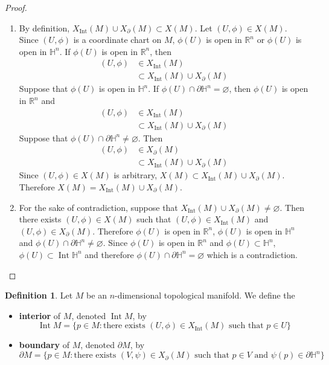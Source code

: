 \documentclass{book}
\theoremstyle{definition}
\newtheorem{defn}[definition]{Definition}
\renewcommand{\H}{\mathbb{H}}
\newcommand{\R}{\mathbb{R}}
\DeclareMathOperator{\Int}{Int}
\DeclareMathOperator*{\0}{\mbf{0}}
\DeclareMathOperator*{\1}{\mbf{1}}
\newcommand{\tbf}[1]{\textbf{#1}}
\newcommand{\p}{\partial}
\begin{document}
	\begin{proof}\
		\begin{enumerate}
			\item By definition, $X_{\Int}(M) \cup X_{\p}(M) \subset X(M)$. Let $(U, \phi) \in X(M)$. Since $(U, \phi)$ is a coordinate chart on $M$, $\phi(U)$ is open in $\R^n$ or $\phi(U)$ is open in $\H^n$. If $\phi(U)$ is open in $\R^n$, then 
			\begin{align*}
				(U, \phi) 
				& \in X_{\Int}(M) \\
				& \subset X_{\Int}(M) \cup X_{\p}(M)
			\end{align*}
			Suppose that $\phi(U)$ is open in $\H^n$. If $\phi(U) \cap \p \H^n = \varnothing$, then $\phi(U)$ is open in $\R^n$ and 
			\begin{align*}
				(U, \phi) 
				& \in X_{\Int}(M) \\
				& \subset X_{\Int}(M) \cup X_{\p}(M)
			\end{align*}
			Suppose that $\phi(U) \cap \p \H^n \neq \varnothing$. Then 
			\begin{align*}
				(U, \phi) 
				& \in X_{\p}(M) \\
				& \subset X_{\Int}(M) \cup X_{\p}(M)
			\end{align*}
			Since $(U, \phi) \in X(M)$ is arbitrary, $X(M) \subset X_{\Int}(M) \cup X_{\p}(M)$. Therefore $X(M) = X_{\Int}(M) \cup X_{\p}(M)$.
			\item For the sake of contradiction, suppose that $X_{\Int}(M) \cup X_{\p}(M) \neq \varnothing$. Then there exists $(U, \phi) \in X(M)$ such that $(U, \phi) \in X_{\Int}(M)$ and $(U, \phi) \in X_{\p}(M)$. Therefore $\phi(U)$ is open in $\R^n$, $\phi(U)$ is open in $\H^n$ and $\phi(U) \cap \p \H^n \neq \varnothing$. Since $\phi(U)$ is open in $\R^n$ and $\phi(U) \subset \H^n$, $\phi(U) \subset \Int \H^n$ and therefore $\phi(U) \cap \p \H^n = \varnothing$ which is a contradiction.
		\end{enumerate}
	\end{proof}

	\begin{defn} Let $M$ be an $n$-dimensional topological manifold. We define the
		\begin{itemize}
			\item \tbf{interior} of $M$, denoted $\Int M$, by 
			$$\Int M = \{p \in M: \text{there exists $(U, \phi) \in X_{\Int}(M)$ such that $p \in U$}\}$$
			\item \tbf{boundary} of $M$, denoted $\p M$, by 
			$$\p M = \{p \in M: \text{there exists $(V, \psi) \in X_{\p}(M)$ such that $p \in V$ and $\psi(p) \in \p \H^n$}\}$$
		\end{itemize}
	\end{defn}
\end{document}
